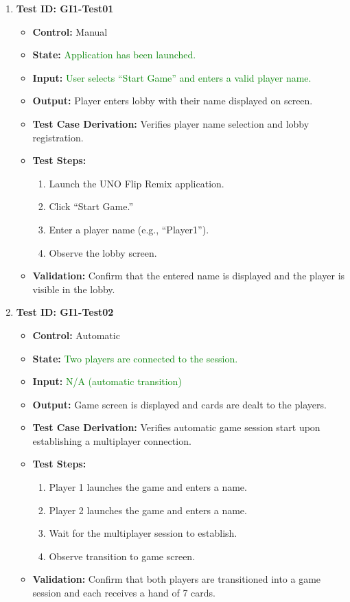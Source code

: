 \documentclass[12pt]{article}
\newcommand{\added}[1]{\textcolor{green}{#1}}
\begin{document}
\begin{enumerate}
    \item \textbf{Test ID: GI1-Test01}
    \begin{itemize}
        \item \textbf{Control:} Manual
        \item \textbf{State:} \added{Application has been launched.}
        \item \textbf{Input:} \added{User selects “Start Game” and enters a valid player name.}
        \item \textbf{Output:} Player enters lobby with their name displayed on screen.
        \item \textbf{Test Case Derivation:} Verifies player name selection and lobby registration.
        \item \textbf{Test Steps:}
        \begin{enumerate}
            \item Launch the UNO Flip Remix application.
            \item Click “Start Game.”
            \item Enter a player name (e.g., “Player1”).
            \item Observe the lobby screen.
        \end{enumerate}
        \item \textbf{Validation:} Confirm that the entered name is displayed and the player is visible in the lobby.
    \end{itemize}

    \item \textbf{Test ID: GI1-Test02}
    \begin{itemize}
        \item \textbf{Control:} Automatic
        \item \textbf{State:} \added{Two players are connected to the session.}
        \item \textbf{Input:} \added{N/A (automatic transition)}
        \item \textbf{Output:} Game screen is displayed and cards are dealt to the players.
        \item \textbf{Test Case Derivation:} Verifies automatic game session start upon establishing a multiplayer connection.
        \item \textbf{Test Steps:}
        \begin{enumerate}
            \item Player 1 launches the game and enters a name.
            \item Player 2 launches the game and enters a name.
            \item Wait for the multiplayer session to establish.
            \item Observe transition to game screen.
        \end{enumerate}
        \item \textbf{Validation:} Confirm that both players are transitioned into a game session and each receives a hand of 7 cards.
    \end{itemize}
\end{enumerate}
\end{document}

